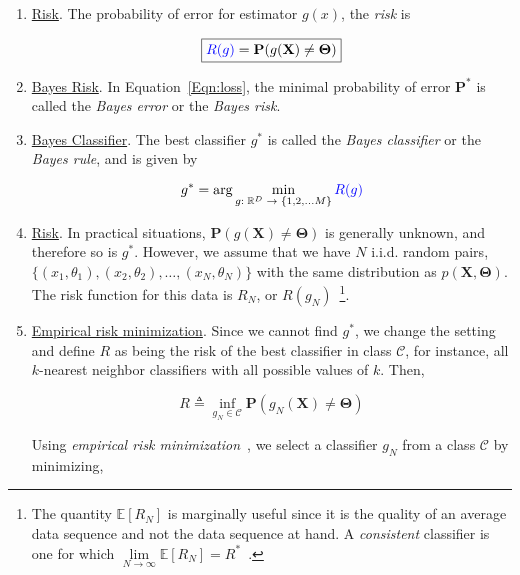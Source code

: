 \begin{enumerate}
\item \underline{Risk}.  The probability of error for estimator $g(x)$, the {\color{blue}\emph{risk}} is

\begin{equation}
\boxed{
{\color{blue}R(g)} = \mathbf{P}(g(\mathbf{X}) \neq \mathbf{\Theta})}
\label{Eqn:loss}
\end{equation}

\item \underline{Bayes Risk}. In Equation~\ref{Eqn:loss}, the minimal probability of error $\mathbf{P}^*$ is called the \emph{Bayes error} or the \emph{Bayes risk}.  

\item \underline{Bayes Classifier}.  The best classifier $g^*$ is called the \emph{Bayes classifier} or the \emph{Bayes rule}, and is given by

\begin{equation}
g^* = \arg\min_{\tiny g:~\mathbb{R}^D~\rightarrow~\{1, 2, \ldots M\}} {\color{blue}R(g)}
\end{equation}

\item \underline{Risk}. In practical situations, $\mathbf{P}(g(\mathbf{X}) \neq \mathbf{\Theta})$ is generally unknown, and therefore so is $g^*$.  However, we assume that we have $N$ i.i.d. random pairs, $\{(x_1, \theta_1), (x_2, \theta_2), \ldots, (x_N, \theta_N)\}$ with the same distribution as $p(\mathbf{X},\mathbf{\Theta})$.  The risk function for this data is $R_N$, or $R(g_N)$~\footnote{The quantity $\mathbb{E}\left[R_N\right]$ is marginally useful since it is the quality of an average data sequence and not the data sequence at hand.  A \emph{consistent} classifier is one for which $\lim\limits_{N \rightarrow \infty}\mathbb{E}\left[R_N\right] = R^*$~\cite{1996_BOOK_PR_DevroyeGyorfiLugosi}.}.
  
\item \underline{Empirical risk minimization}.
Since we cannot find $g^*$, we change the setting and define $R$ as being the risk of the best classifier in class $\mathcal{C}$, for instance, all $k$-nearest neighbor classifiers with all possible values of $k$.  Then,

\begin{equation}
R \triangleq \inf\limits_{g_N \in \mathcal{C}} \mathbf{P}(g_N(\mathbf{X}) \neq \mathbf{\Theta})
\end{equation}

Using \emph{empirical risk minimization}~\cite{1999_BOOK_PRML_Vapnik}, we select a classifier $g_N$ from a class $\mathcal{C}$ by minimizing, 


\end{enumerate}
